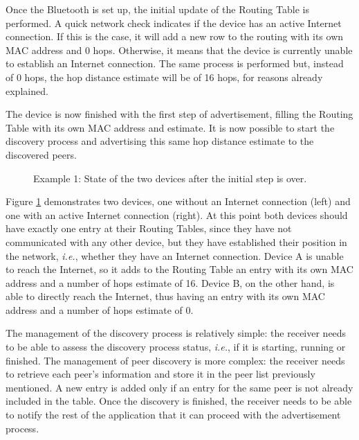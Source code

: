 Once the Bluetooth is set up, the initial update of the Routing Table is performed. A quick network check indicates if the device has an active Internet connection. If this is the case, it will add a new row to the routing with its own \gls{MAC} address and 0 hops. Otherwise, it means that the device is currently unable to establish an Internet connection. The same process is performed but, instead of 0 hops, the hop distance estimate will be of 16 hops, for reasons already explained.

The device is now finished with the first step of advertisement, filling the Routing Table with its own \gls{MAC} address and estimate. It is now possible to start the discovery process and advertising this same hop distance estimate to the discovered peers.

\begin{figure}[ht]
	\noindent{}
	\caption{\label{fig:adveg1} Example 1: State of the two devices after the initial step is over.}
\end{figure}

Figure \ref{fig:adveg1} demonstrates two devices, one without an Internet connection (left) and one with an active Internet connection (right). At this point both devices should have exactly one entry at their Routing Tables, since they have not communicated with any other device, but they have established their position in the network, \textit{i.e.}, whether they have an Internet connection. Device A is unable to reach the Internet, so it adds to the Routing Table an entry with its own \gls{MAC} address and a number of hops estimate of 16. Device B, on the other hand, is able to directly reach the Internet, thus having an entry with its own \gls{MAC} address and a number of hops estimate of 0.

The management of the discovery process is relatively simple: the receiver needs to be able to assess the discovery process status, \textit{i.e.}, if it is starting, running or finished. The management of peer discovery is more complex: the receiver needs to retrieve each peer's information and store it in the peer list previously mentioned. A new entry is added only if an entry for the same peer is not already included in the table. Once the discovery is finished, the receiver needs to be able to notify the rest of the application that it can proceed with the advertisement process.

